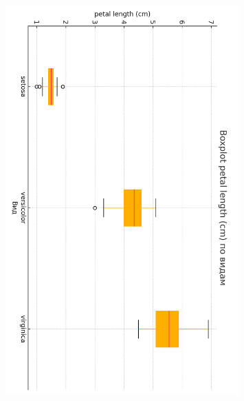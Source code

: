 \begin{figure}[H]
  \ContinuedFloat
  \centering
  \includegraphics[width=0.8\textwidth]{images/box_petal_length_cm_cb2.png}\\[6pt]

\end{figure}
